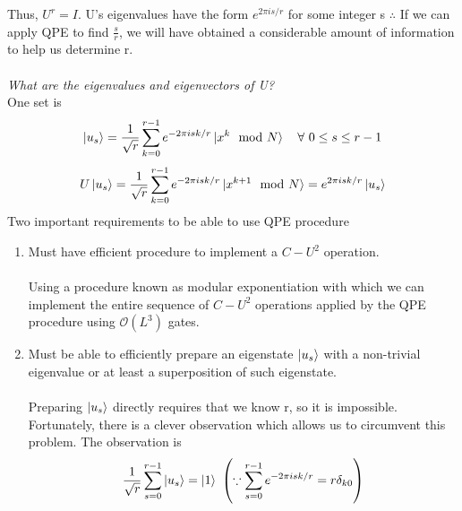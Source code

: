 \documentclass[]{article}
\theoremstyle{nonumberplain}
\begin{document}
Thus, $U^{r}=I$. U's eigenvalues have the form $e^{2\pi is/r}$ for some integer s $\therefore$ If we can apply QPE to find  $\frac{s}{r}$, we will have obtained a considerable amount of information to help us determine r.\\
\\
\textit{What are the eigenvalues and eigenvectors of U?}\\
One set is 
\[
	\ket{u_s} = \frac{1}{\sqrt{r}} \sum^{r-1}_{k=0} e^{-2\pi i s k /r}\ket{x^{k}\mod{N}}\quad \forall\ 0\leq s \leq r-1 
\]
\[
U\ket{u_{s}} = \frac{1}{\sqrt{r}} \sum^{r-1}_{k=0} e^{-2\pi i s k /r}\ket{x^{k+1}\mod{N}} = e^{2\pi i s k /r}\ket{u_{s}}
\] 
Two important requirements to be able to use QPE procedure
\begin{enumerate}
	\item Must have efficient procedure to implement a $C-U^{2}$ operation.\\\\
		Using a procedure known as modular exponentiation with which we can implement the entire sequence of $C-U^{2}$ operations applied by the QPE procedure using $\mathcal{O}(L^{3})$ gates.
	\item Must be able to efficiently prepare an eigenstate $\ket{u_{s}}$ with a non-trivial eigenvalue or at least a superposition of such eigenstate.\\\\
	Preparing $\ket{u_{s}}$ directly requires that we know r, so it is impossible. Fortunately, there is a clever observation which allows us to circumvent this problem. The observation is 
\[
	\frac{1}{\sqrt{r}} \sum^{r-1}_{s=0} \ket{u_{s}} = \ket{1} \ \left(\because \sum^{r-1}_{s=0} e^{-2\pi i s k /r} = r\delta_{k0}\right)
\] 
\end{enumerate}
\end{document}
